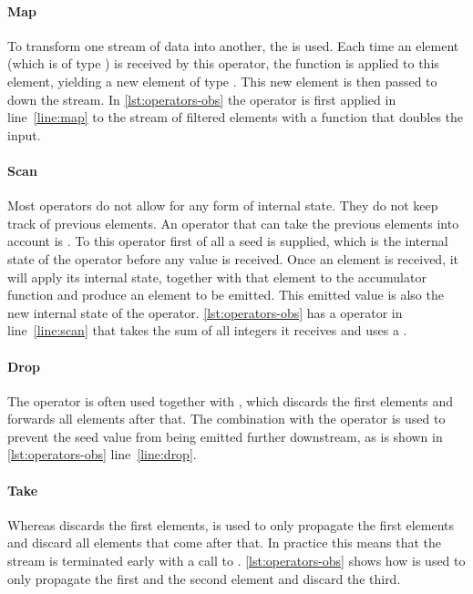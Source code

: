 \paragraph{Map}To transform one stream of data into another, the  is used. Each time an element (which is of type ) is received by this operator, the function  is applied to this element, yielding a new element of type . This new element is then passed to down the stream. In \autoref{lst:operators-obs} the  operator is first applied in line~\ref{line:map} to the stream of filtered elements with a function that doubles the input.

\paragraph{Scan}Most operators do not allow for any form of internal state. They do not keep track of previous elements. An operator that can take the previous elements into account is . To this operator first of all a seed is supplied, which is the internal state of the operator before any value is received. Once an element is received, it will apply its internal state, together with that element to the accumulator function  and produce an element to be emitted. This emitted value is also the new internal state of the operator. \autoref{lst:operators-obs} has a  operator in line~\ref{line:scan} that takes the sum of all integers it receives and uses a .

\paragraph{Drop}The  operator is often used together with , which discards the first  elements and forwards all elements after that. The combination with the  operator is used to prevent the seed value from being emitted further downstream, as is shown in \autoref{lst:operators-obs} line~\ref{line:drop}.

\paragraph{Take}Whereas  discards the first  elements,  is used to only propagate the first  elements and discard all elements that come after that. In practice this means that the stream is terminated early with a call to . \autoref{lst:operators-obs} shows how  is used to only propagate the first and the second element and discard the third.

